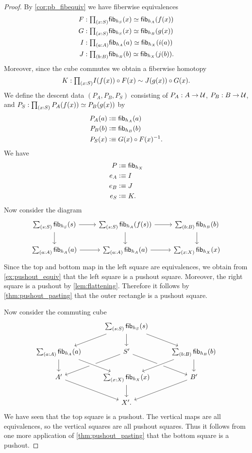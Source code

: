 \begin{proof}
By \cref{cor:pb_fibequiv} we have fiberwise equivalences
\begin{align*}
F & : \prd{x:S}\eqv{\fib{h_S}{x}}{\fib{h_A}{f(x)}} \\
G & : \prd{x:S}\eqv{\fib{h_S}{x}}{\fib{h_B}{g(x)}} \\
I & : \prd{a:A}\eqv{\fib{h_A}{a}}{\fib{h_X}{i(a)}} \\
J & : \prd{b:B}\eqv{\fib{h_B}{b}}{\fib{h_X}{j(b)}}. 
\end{align*}
Moreover, since the cube commutes we obtain a fiberwise homotopy
\begin{equation*}
K : \prd{x:S} I(f(x))\circ F(x) \htpy J(g(x))\circ G(x).
\end{equation*}
We define the descent data $(P_A,P_B,P_S)$ consisting of $P_A:A\to\mathcal{U}$, $P_B:B\to\mathcal{U}$, and $P_S:\prd{x:S}\eqv{P_A(f(x))}{P_B(g(x))}$ by
\begin{align*}
P_A(a) & \vcentcolon\equiv \mathsf{fib}_{h_A}(a) \\
P_B(b) & \vcentcolon\equiv \mathsf{fib}_{h_B}(b) \\
P_S(x) & \vcentcolon\equiv G(x)\circ F(x)^{-1}.
\end{align*}
We have
\begin{align*}
P & \vcentcolon\equiv \mathsf{fib}_{h_X} \\
e_A & \vcentcolon\equiv I \\
e_B & \vcentcolon\equiv J \\
e_S & \vcentcolon\equiv K.
\end{align*}
Now consider the diagram
\begin{equation*}
\begin{tikzcd}
\sm{s:S}\fib{h_S}{s} \arrow[r] \arrow[d] & \sm{s:S}\fib{h_A}{f(s)} \arrow[r] \arrow[d] & \sm{b:B}\fib{h_B}{b} \arrow[d] \\
\sm{a:A}\fib{h_A}{a} \arrow[r] & \sm{a:A}\fib{h_A}{a} \arrow[r] & \sm{x:X}\fib{h_X}{x}
\end{tikzcd}
\end{equation*}
Since the top and bottom map in the left square are equivalences, we obtain from \cref{ex:pushout_equiv} that the left square is a pushout square. Moreover, the right square is a pushout by \cref{lem:flattening}. Therefore it follows by \cref{thm:pushout_pasting} that the outer rectangle is a pushout square.

Now consider the commuting cube
\begin{equation*}
\begin{tikzcd}
& \sm{s:S}\fib{h_S}{s} \arrow[dl] \arrow[dr] \arrow[d] \\
\sm{a:A}\fib{h_A}{a} \arrow[d] & S' \arrow[dl] \arrow[dr] & \sm{b:B}\fib{h_B}{b} \arrow[dl,crossing over] \arrow[d] \\
A' \arrow[dr,swap] & \sm{x:X}\fib{h_X}{x} \arrow[d] \arrow[from=ul,crossing over] & B' \arrow[dl] \\
& X'.
\end{tikzcd}
\end{equation*}
We have seen that the top square is a pushout. The vertical maps are all equivalences, so the vertical squares are all pushout squares. Thus it follows from one more application of \cref{thm:pushout_pasting} that the bottom square is a pushout.
\end{proof}


